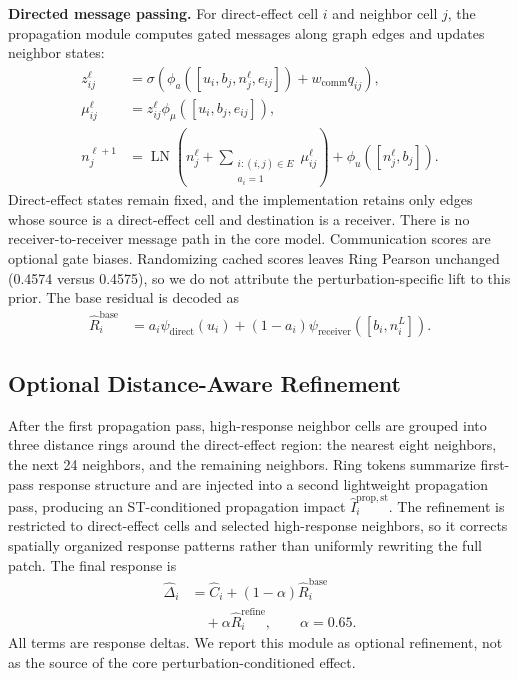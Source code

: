 \documentclass[sigconf,review,balance=false]{acmart}
\begin{document}
\noindent\textbf{Directed message passing.}
For direct-effect cell $i$ and neighbor cell $j$, the propagation module computes gated messages along graph edges and updates neighbor states:
\begin{equation}
\label{eq:directed_message_passing}
\begin{aligned}
z_{ij}^{\ell}
&= \sigma\!\left(\phi_a([u_i,b_j,n_j^\ell,e_{ij}])
   +w_{\mathrm{comm}}q_{ij}\right),\\
\mu_{ij}^{\ell}
&= z_{ij}^{\ell}\phi_\mu([u_i,b_j,e_{ij}]),\\
n_j^{\ell+1}
&= \operatorname{LN}\!\left(n_j^\ell+
   \sum_{\substack{i:(i,j)\in E\\ a_i=1}}\mu_{ij}^{\ell}
   \right)+\phi_u([n_j^\ell,b_j]).
\end{aligned}
\end{equation}
Direct-effect states remain fixed, and the implementation retains only edges
whose source is a direct-effect cell and destination is a receiver. There is no
receiver-to-receiver message path in the core model. Communication scores are
optional gate biases. Randomizing cached scores leaves Ring Pearson unchanged
(0.4574 versus 0.4575), so we do not attribute the perturbation-specific lift
to this prior. The base residual is decoded as
\begin{equation}
\label{eq:base_propagation_impact}
\begin{aligned}
\widehat R_i^{\mathrm{base}}
&= a_i\psi_{\mathrm{direct}}(u_i)
 +(1-a_i)\psi_{\mathrm{receiver}}([b_i,n_i^L]).
\end{aligned}
\end{equation}


\subsection{Optional Distance-Aware Refinement}
\label{sec:method_st_refinement}

After the first propagation pass, high-response neighbor cells are grouped into three distance rings around the direct-effect region: the nearest eight neighbors, the next 24 neighbors, and the remaining neighbors. Ring tokens summarize first-pass response structure and are injected into a second lightweight propagation pass, producing an ST-conditioned propagation impact $\widehat I_i^{\mathrm{prop},\mathrm{st}}$. The refinement is restricted to direct-effect cells and selected high-response neighbors, so it corrects spatially organized response patterns rather than uniformly rewriting the full patch. The final response is
\begin{equation}
\label{eq:final_response_prediction}
\begin{aligned}
\widehat\Delta_i
&= \widehat C_i
 + (1-\alpha)\widehat R_i^{\mathrm{base}}\\
&\quad + \alpha\widehat R_i^{\mathrm{refine}},
\qquad \alpha=0.65 .
\end{aligned}
\end{equation}
All terms are response deltas. We report this module as optional refinement,
not as the source of the core perturbation-conditioned effect.
\end{document}
